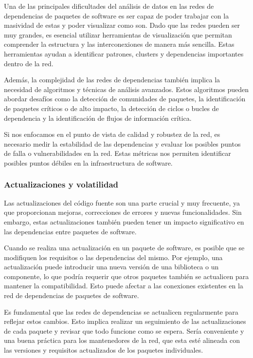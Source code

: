 Una de las principales dificultades del análisis de datos en las redes de dependencias de paquetes de software es ser capaz de poder trabajar con la masividad de estas y poder visualizar como son. Dado que las redes pueden ser muy grandes, es esencial utilizar herramientas de visualización que permitan comprender la estructura y las interconexiones de manera más sencilla. Estas herramientas ayudan a identificar patrones, clusters y dependencias importantes dentro de la red.

Además, la complejidad de las redes de dependencias también implica la necesidad de algoritmos y técnicas de análisis avanzados. Estos algoritmos pueden abordar desafíos como la detección de comunidades de paquetes, la identificación de paquetes críticos o de alto impacto, la detección de ciclos o bucles de dependencia y la identificación de flujos de información crítica.

Si nos enfocamos en el punto de vista de calidad y robustez de la red, es necesario medir la estabilidad de las dependencias y evaluar los posibles puntos de falla o vulnerabilidades en la red. Estas métricas nos permiten identificar posibles puntos débiles en la infraestructura de software.

\subsubsection{Actualizaciones y volatilidad}

Las actualizaciones del código fuente son una parte crucial y muy frecuente, ya que proporcionan mejoras, correcciones de errores y nuevas funcionalidades. Sin embargo, estas actualizaciones también pueden tener un impacto significativo en las dependencias entre paquetes de software.

Cuando se realiza una actualización en un paquete de software, es posible que se modifiquen los requisitos o las dependencias del mismo. Por ejemplo, una actualización puede introducir una nueva versión de una biblioteca o un componente, lo que podría requerir que otros paquetes también se actualicen para mantener la compatibilidad. Esto puede afectar a las conexiones existentes en la red de dependencias de paquetes de software.

Es fundamental que las redes de dependencias se actualicen regularmente para reflejar estos cambios. Esto implica realizar un seguimiento de las actualizaciones de cada paquete y revisar que todo funcione como se espera. Sería conveniente y una buena práctica para los mantenedores de la red, que esta esté alineada con las versiones y requisitos actualizados de los paquetes individuales.

